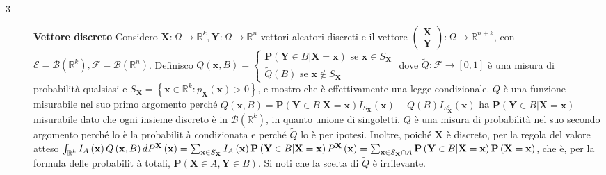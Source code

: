 \documentclass{article}
\begin{document}
\begin{description}
\item[3] \textbf{Vettore discreto} Considero $\mathbf{X}:\Omega \rightarrow 
\mathbb{R}
^{k},\mathbf{Y}:\Omega \rightarrow 
\mathbb{R}
^{n}$ vettori aleatori discreti e il vettore $\left( 
\begin{array}{c}
\mathbf{X} \\ 
\mathbf{Y}%
\end{array}%
\right) :\Omega \rightarrow 
\mathbb{R}
^{n+k}$, con $\mathcal{E=B}\left( 
\mathbb{R}
^{k}\right) ,\mathcal{F=B}\left( 
\mathbb{R}
^{n}\right) $. Definisco $Q\left( \mathbf{x},B\right) =\left\{ 
\begin{array}{c}
\mathbf{P}\left( \mathbf{Y}\in B|\mathbf{X=x}\right) \text{ se }\mathbf{x}%
\in S_{\mathbf{X}} \\ 
\tilde{Q}\left( B\right) \text{ se }\mathbf{x}\not\in S_{\mathbf{X}}%
\end{array}%
\right. $ dove $\tilde{Q}:\mathcal{F\rightarrow }\left[ 0,1\right] $ \`{e}
una misura di probabilit\`{a} qualsiasi e $S_{\mathbf{X}}=\left\{ \mathbf{x}%
\in 
\mathbb{R}
^{k}:p_{\mathbf{X}}\left( \mathbf{x}\right) >0\right\} $, e mostro che \`{e}
effettivamente una legge condizionale. $Q$ \`{e} una funzione misurabile nel
suo primo argomento perch\'{e} $Q\left( \mathbf{x},B\right) =\mathbf{P}%
\left( \mathbf{Y}\in B|\mathbf{X=x}\right) I_{S_{\mathbf{X}}}\left( \mathbf{x%
}\right) +\tilde{Q}\left( B\right) I_{S_{\mathbf{X}}^{c}}\left( \mathbf{x}%
\right) $ ha $\mathbf{P}\left( \mathbf{Y}\in B|\mathbf{X=x}\right) $
misurabile dato che ogni insieme discreto \`{e} in $\mathcal{B}\left( 
\mathbb{R}
^{k}\right) $, in quanto unione di singoletti. $Q$ \`{e} una misura di
probabilit\`{a} nel suo secondo argomento perch\'{e} lo \`{e} la probabilit%
\`{a} condizionata e perch\'{e} $\tilde{Q}$ lo \`{e} per ipotesi. Inoltre,
poich\'{e} $\mathbf{X}$ \`{e} discreto, per la regola del valore atteso $%
\int_{%
\mathbb{R}
^{k}}I_{A}\left( \mathbf{x}\right) Q\left( \mathbf{x},B\right) dP^{\mathbf{X}%
}\left( \mathbf{x}\right) =\sum_{\mathbf{x}\in S_{\mathbf{X}}}I_{A}\left( 
\mathbf{x}\right) \mathbf{P}\left( \mathbf{Y}\in B|\mathbf{X=x}\right) P^{%
\mathbf{X}}\left( \mathbf{x}\right) =\sum_{\mathbf{x}\in S_{\mathbf{X}}\cap
A}\mathbf{P}\left( \mathbf{Y}\in B|\mathbf{X=x}\right) \mathbf{P}\left( 
\mathbf{X}=\mathbf{x}\right) $, che \`{e}, per la formula delle probabilit%
\`{a} totali, $\mathbf{P}\left( \mathbf{X}\in A,\mathbf{Y}\in B\right) $. Si
noti che la scelta di $\tilde{Q}$ \`{e} irrilevante.


\end{description}
\end{document}
